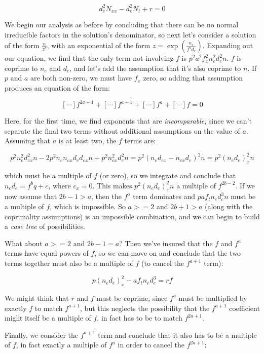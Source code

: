 \documentclass{article}
\begin{document}
$$ d_e^{2}N_{xx} -d_e^{2}N_t + r = 0$$



\vskip 1in

We begin our analysis as before by concluding that there can be no
normal irreducible factors in the solution's denominator, so next
let's consider a solution of the form $\frac{n}{z^p}$, with an
exponential of the form $z=\exp(\frac{n_e}{f^a d_e})$.  Expanding out
our equation, we find that the only term not involving $f$ is
$p^{2}a^{2}f_x^{2}n_e^{2}d_e^{2}n$.  $f$ is coprime to $n_e$ and $d_e$,
and let's add the assumption that it's also coprime to $n$.  If $p$
and $a$ are both non-zero, we must have $f_x$ zero, so adding that
assumption produces an equation of the form:

$$[\cdots]f^{2a+1} + [\cdots]f^{a+1} + [\cdots]f^a + [\cdots]f = 0$$

Here, for the first time, we find exponents that are {\it incomparable},
since we can't separate the final two terms without additional
assumptions on the value of $a$.  Assuming that $a$ is at least two,
the $f$ terms are:

$$p^{2}n_e^{2}d_{ex}^{2}n -2p^{2}n_en_{ex}d_ed_{ex}n +p^{2}n_{ex}^{2}d_e^{2}n = p^2(n_e d_{ex} - n_{ex} d_e)^2n = p^2(n_e d_e)_x^2n$$

which must be a multiple of $f$ (or zero), so we integrate and
conclude that $n_e d_e = f^b q+c$, where $c_x=0$.  This makes
$p^2(n_e d_e)_x^2n$ a multiple of $f^{2b-2}$.  If we now assume
that $2b-1 > a$, then the $f^a$ term dominates and $paf_tn_ed_e^{3}n$
must be a multiple of $f$, which is impossible.  So $a>=2$ and $2b+1>a$
(along with the coprimality assumptions) is an impossible combination,
and we can begin to build a {\it case tree} of possibilities.

What about $a>=2$ and $2b-1=a$?  Then we've insured that the
$f$ and $f^a$ terms have equal powers of $f$, so we can
move on and conclude that the two terms together must also
be a multiple of $f$ (to cancel the $f^{a+1}$ term):

$$p(n_e d_e)_x^2 - af_tn_ed_e^{3} = rf$$

We might think that $r$ and $f$ must be coprime, since $f^a$ must be
multiplied by exactly $f$ to match $f^{a+1}$, but this neglects the
possibility that the $f^{a+1}$ coefficient might itself be a multiple
of $f$, in fact has to be to match $f^{2a+1}$.

Finally, we consider the $f^{a+1}$ term and conclude that it also has
to be a multiple of $f$, in fact exactly a multiple of $f^a$ in order
to cancel the $f^{2a+1}$:
\end{document}
